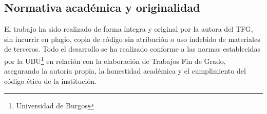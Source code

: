 \subsection{Normativa académica y originalidad}

El trabajo ha sido realizado de forma íntegra y original por la autora del TFG, sin incurrir en plagio, copia de código sin atribución o uso indebido de materiales de terceros.
Todo el desarrollo se ha realizado conforme a las normas establecidas por la UBU\footnote{Universidad de Burgos} en relación con la elaboración de Trabajos Fin de Grado, asegurando la autoría propia, la honestidad académica y el cumplimiento del código ético de la institución.






